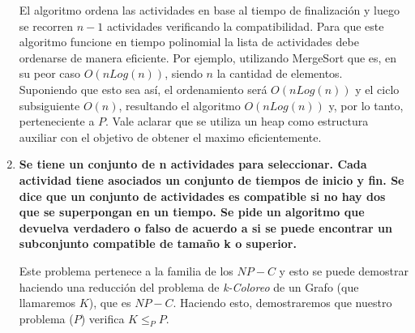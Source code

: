 \documentclass{article}
\newcommand\tab[1][0.5cm]{\hspace*{#1}}
\begin{document}
\begin{enumerate}
            \tab El algoritmo ordena las actividades en base al tiempo de finalización y luego se recorren $n-1$
            actividades verificando la compatibilidad.
            \tab Para que este algoritmo funcione en tiempo polinomial la lista de actividades debe ordenarse
            de manera eficiente. Por ejemplo, utilizando MergeSort que es, en su peor caso $O(n Log(n))$, siendo
            $n$ la cantidad de elementos.\\
            \tab Suponiendo que esto sea así, el ordenamiento será $O(n Log(n))$ y el ciclo subsiguiente $O(n)$,
            resultando el algoritmo $O(n Log(n))$ y, por lo tanto, perteneciente a $P$.
            \tab Vale aclarar que se utiliza un heap como estructura auxiliar con el objetivo de obtener el maximo eficientemente.

        \item \textbf{Se tiene un conjunto de n actividades para seleccionar. Cada actividad tiene asociados un conjunto de
            tiempos de inicio y fin. Se dice que un conjunto de actividades es compatible si no hay dos que se
            superpongan en un tiempo. Se pide un algoritmo que devuelva verdadero o falso de acuerdo a si se
            puede encontrar un subconjunto compatible de tamaño k o superior.} %

            \tab Este problema pertenece a la familia de los $NP-C$ y esto se puede demostrar haciendo una reducción
            del problema de \emph{k-Coloreo} de un Grafo (que llamaremos $K$), que es $NP-C$. Haciendo esto,
            demostraremos que nuestro problema ($P$) verifica $K \leq_{P} P$.


\end{enumerate}
\end{document}
